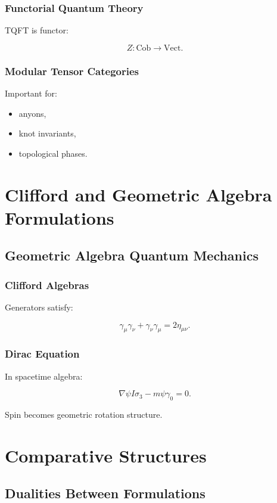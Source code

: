 \documentclass[11pt]{book}
\begin{document}
\section{Functorial Quantum Theory}

TQFT is functor:

\[
Z:
\mathrm{Cob}
\to
\mathrm{Vect}.
\]

\section{Modular Tensor Categories}

Important for:

\begin{itemize}
\item anyons,
\item knot invariants,
\item topological phases.
\end{itemize}

\part{Clifford and Geometric Algebra Formulations}

\chapter{Geometric Algebra Quantum Mechanics}

\section{Clifford Algebras}

Generators satisfy:

\[
\gamma_\mu\gamma_\nu
+
\gamma_\nu\gamma_\mu
=
2\eta_{\mu\nu}.
\]

\section{Dirac Equation}

In spacetime algebra:

\[
\nabla\psi I\sigma_3
-
m\psi\gamma_0
=0.
\]

Spin becomes geometric rotation structure.

\part{Comparative Structures}

\chapter{Dualities Between Formulations}
\end{document}
